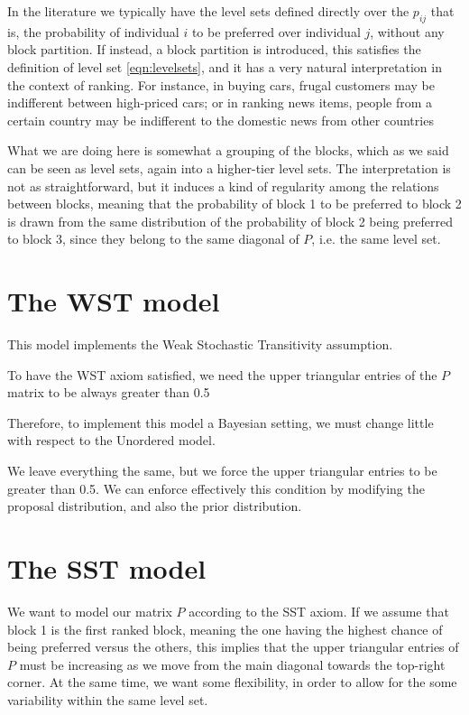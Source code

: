 \documentclass[11pt]{amsart}
\begin{document}
In the literature we typically have the level sets defined directly over the $p_{ij}$ that is, the probability of individual $i$ to be preferred over individual $j$, without any block partition. If instead, a block partition is introduced, this satisfies the definition of level set \eqref{eqn:levelsets}, and it has a very natural interpretation in the context of ranking. For instance, in buying cars, frugal customers may be indifferent between high-priced cars; or in ranking news items, people from a certain country may be indifferent to the domestic news from other countries

What we are doing here is somewhat a grouping of the blocks, which as we said can be seen as level sets, again into a higher-tier level sets. The interpretation is not as straightforward, but it induces a kind of regularity among the relations between blocks, meaning that the probability of block 1 to be preferred to block 2 is drawn from the same distribution of the probability of block 2 being preferred to block 3, since they belong to the same diagonal of $P$, i.e. the same level set.

\section{The WST model}

This model implements the Weak Stochastic Transitivity assumption.

To have the WST axiom satisfied, we need the upper triangular entries of the $P$ matrix to be always greater than 0.5

Therefore, to implement this model a Bayesian setting, we must change little with respect to the Unordered model.

We leave everything the same, but we force the upper triangular entries to be greater than 0.5. We can enforce effectively this condition by modifying the proposal distribution, and also the prior distribution.

\section{The SST model}

We want to model our matrix $P$ according to the SST axiom. If we assume that block 1 is the first ranked block, meaning the one having the highest chance of being preferred versus the others, this implies that the upper triangular entries of $P$ must be increasing as we move from the main diagonal towards the top-right corner. At the same time, we want some flexibility, in order to allow for the some variability within the same level set. 
\end{document}
